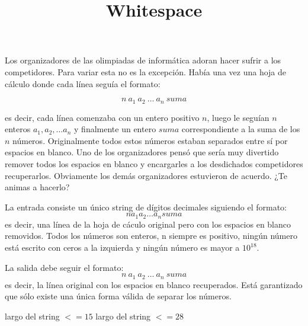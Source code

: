 \documentclass{oci}
\title{Whitespace}
\begin{document}
\begin{problemDescription}
Los organizadores de las olimpiadas de informática adoran hacer sufrir a los competidores. Para variar esta no es la excepción. Había una vez una hoja de cálculo donde cada línea seguía el formato:

$$n\ a_1\ a_2\ \dots\ a_n\ suma$$

es decir, cada línea comenzaba con un entero positivo $n$, luego le seguían $n$ enteros $a_1, a_2, \dots a_n$ y finalmente un entero $suma$ correspondiente a la suma de los $n$ números. Originalmente todos estos números estaban separados entre sí por espacios en blanco. Uno de los organizadores pensó que sería muy divertido remover todos los espacios en blanco y encargarles a los desdichados competidores recuperarlos. Obviamente los demás organizadores estuvieron de acuerdo. ¿Te animas a hacerlo?
\end{problemDescription}

\begin{inputDescription}
La entrada consiste un único string de dígitos decimales siguiendo el formato:
$$n a_1 a_2 \dots a_n suma$$
es decir, una línea de la hoja de cáculo original pero con los espacios en blanco removidos. Todos los números son enteros, n siempre es positivo, ningún número está escrito con ceros a la izquierda y ningún número es mayor a $10^{18}$.
\end{inputDescription}

\begin{outputDescription}
La salida debe seguir el formato:
$$n\ a_1\ a_2\ \dots\ a_n\ suma$$
es decir, la línea original con los espacios en blanco recuperados. Está garantizado que sólo existe una única forma válida de separar los números.
\end{outputDescription}

\begin{scoreDescription}
   largo del string $<= 15$
   largo del string $<= 28$
\end{scoreDescription}

\begin{sampleDescription}
\end{sampleDescription}
\end{document}
